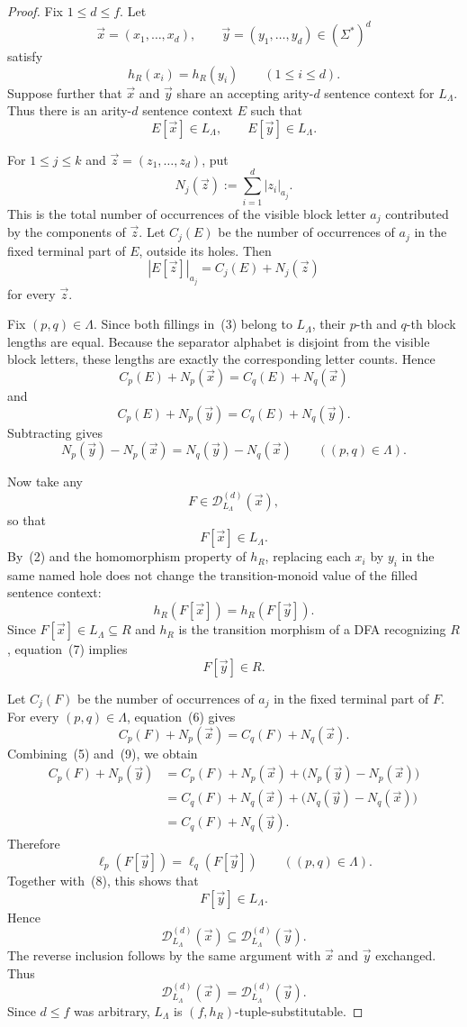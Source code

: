 \documentclass[11pt,a4paper]{article}
\theoremstyle{remark}
\newcommand{\D}{\mathcal{D}}
\newcommand{\tuple}[1]{\vec{#1}}
\begin{document}
\begin{proof}
Fix \(1\le d\le f\).  Let
\[
  \tuple x=(x_1,\ldots,x_d),
  \qquad
  \tuple y=(y_1,\ldots,y_d)
  \in(\Sigma^*)^d
\]
satisfy
\[
  h_R(x_i)=h_R(y_i)
  \qquad (1\le i\le d).
  \tag{2}
\]
Suppose further that \(\tuple x\) and \(\tuple y\) share an accepting
arity-\(d\) sentence context for \(L_\Lambda\).  Thus there is an arity-\(d\)
sentence context \(E\) such that
\[
  E[\tuple x]\in L_\Lambda,
  \qquad
  E[\tuple y]\in L_\Lambda.
  \tag{3}
\]

For \(1\le j\le k\) and
\(\tuple z=(z_1,\ldots,z_d)\), put
\[
  N_j(\tuple z)
  :=
  \sum_{i=1}^d |z_i|_{a_j}.
\]
This is the total number of occurrences of the visible block letter \(a_j\)
contributed by the components of \(\tuple z\).  Let \(C_j(E)\) be the number of
occurrences of \(a_j\) in the fixed terminal part of \(E\), outside its holes.
Then
\[
  |E[\tuple z]|_{a_j}
  =
  C_j(E)+N_j(\tuple z)
  \tag{4}
\]
for every \(\tuple z\).

Fix \((p,q)\in\Lambda\).  Since both fillings in~(3) belong to
\(L_\Lambda\), their \(p\)-th and \(q\)-th block lengths are equal.  Because
the separator alphabet is disjoint from the visible block letters, these
lengths are exactly the corresponding letter counts.  Hence
\[
  C_p(E)+N_p(\tuple x)
  =
  C_q(E)+N_q(\tuple x)
\]
and
\[
  C_p(E)+N_p(\tuple y)
  =
  C_q(E)+N_q(\tuple y).
\]
Subtracting gives
\[
  N_p(\tuple y)-N_p(\tuple x)
  =
  N_q(\tuple y)-N_q(\tuple x)
  \qquad ((p,q)\in\Lambda).
  \tag{5}
\]

Now take any
\[
  F\in\D_{L_\Lambda}^{(d)}(\tuple x),
\]
so that
\[
  F[\tuple x]\in L_\Lambda.
  \tag{6}
\]
By~(2) and the homomorphism property of \(h_R\), replacing each \(x_i\) by
\(y_i\) in the same named hole does not change the transition-monoid value of
the filled sentence context:
\[
  h_R(F[\tuple x])
  =
  h_R(F[\tuple y]).
  \tag{7}
\]
Since \(F[\tuple x]\in L_\Lambda\subseteq R\) and \(h_R\) is the transition
morphism of a DFA recognizing \(R\), equation~(7) implies
\[
  F[\tuple y]\in R.
  \tag{8}
\]

Let \(C_j(F)\) be the number of occurrences of \(a_j\) in the fixed terminal
part of \(F\).  For every \((p,q)\in\Lambda\), equation~(6) gives
\[
  C_p(F)+N_p(\tuple x)
  =
  C_q(F)+N_q(\tuple x).
  \tag{9}
\]
Combining~(5) and~(9), we obtain
\[
\begin{aligned}
  C_p(F)+N_p(\tuple y)
  &=
  C_p(F)+N_p(\tuple x)
    +\bigl(N_p(\tuple y)-N_p(\tuple x)\bigr)
  \\
  &=
  C_q(F)+N_q(\tuple x)
    +\bigl(N_q(\tuple y)-N_q(\tuple x)\bigr)
  \\
  &=
  C_q(F)+N_q(\tuple y).
\end{aligned}
\]
Therefore
\[
  \ell_p(F[\tuple y])
  =
  \ell_q(F[\tuple y])
  \qquad ((p,q)\in\Lambda).
\]
Together with~(8), this shows that
\[
  F[\tuple y]\in L_\Lambda.
\]
Hence
\[
  \D_{L_\Lambda}^{(d)}(\tuple x)
  \subseteq
  \D_{L_\Lambda}^{(d)}(\tuple y).
\]
The reverse inclusion follows by the same argument with \(\tuple x\) and
\(\tuple y\) exchanged.  Thus
\[
  \D_{L_\Lambda}^{(d)}(\tuple x)
  =
  \D_{L_\Lambda}^{(d)}(\tuple y).
\]
Since \(d\le f\) was arbitrary, \(L_\Lambda\) is
\((f,h_R)\)-tuple-substitutable.
\end{proof}
\end{document}
